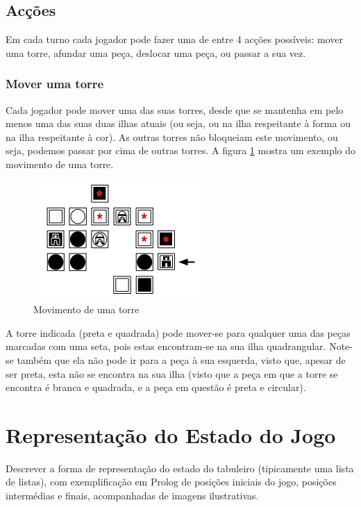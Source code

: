 \documentclass[a4paper]{article}
\begin{document}
\subsection{Acções}

Em cada turno cada jogador pode fazer uma de entre 4 acções possíveis: mover uma torre, afundar uma peça, deslocar uma peça, ou passar a sua vez.

\subsubsection{Mover uma torre}

Cada jogador pode mover uma das suas torres, desde que se mantenha em pelo menos uma das suas duas ilhas atuais (ou seja, ou na ilha respeitante à forma ou na ilha respeitante à cor). As outras torres não bloqueiam este movimento, ou seja, podemos passar por cima de outras torres.  A figura \ref{fig:towermovement} mostra um exemplo do movimento de uma torre.

\begin{figure}[h]
\centering
\includegraphics[scale=0.5]{towermovement.png}
\caption{Movimento de uma torre}
\label{fig:towermovement}
\end{figure}

A torre indicada (preta e quadrada) pode mover-se para qualquer uma das peças marcadas com uma seta, pois estas encontram-se na sua ilha quadrangular. Note-se também que ela não pode ir para a peça à sua esquerda, visto que, apesar de ser preta, esta não se encontra na sua ilha (visto que a peça em que a torre se encontra é branca e quadrada, e a peça em questão é preta e circular).

\section{Representação do Estado do Jogo}

Descrever a forma de representação do estado do tabuleiro (tipicamente uma lista de listas), com exemplificação em Prolog de posições iniciais do jogo, posições intermédias e finais, acompanhadas de imagens ilustrativas.
\end{document}
